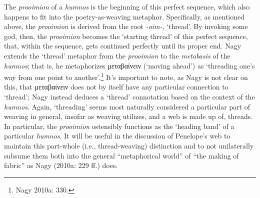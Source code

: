 \documentclass[12pt]{article}
\begin{document}
The \textit{prooimion} of a \textit{humnos} is the beginning of this perfect sequence, which also happens to fit into the poetry-as-weaving metaphor. Specifically, as mentioned above, the \textit{prooimion} is derived from the root \textit{-oim-}, `thread'. By invoking some god, then, the \textit{prooimion} becomes the `starting thread' of this perfect sequence, that, within the sequence, gets continued perfectly until its proper end. Nagy extends the `thread' metaphor from the \textit{prooimion} to the \textit{metabasis} of the \textit{humnos}; that is, he metaphorizes μεταβαίνειν (`moving ahead') as `threading one's way from one point to another'.\footnote{ Nagy 2010a: 330.} It's important to note, as Nagy is not clear on this, that μεταβαίνειν does not by itself have any particular connection to `thread'; Nagy instead deduces a `thread' connotation based on the context of the \textit{humnos}. Again, `threading' seems most naturally considered a particular part of weaving in general, insofar as weaving utilizes, and a web is made up of, threads. In particular, the \textit{prooimion} ostensibly functions as the `heading band' of a particular \textit{humnos}. It will be useful in the discussion of Penelope's web to maintain this part-whole (i.e., thread-weaving) distinction and to not unilaterally subsume them both into the general ``metaphorical world'' of ``the making of fabric'' as Nagy (2010a: 229 ff.) does.
\end{document}
